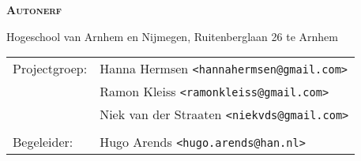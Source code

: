 \begin{titlepage}

\Huge \textsc{\bfseries Autonerf} \normalsize

\vfill

\begin{minipage}[b][1em][b]{\linewidth}
    Hogeschool van Arnhem en Nijmegen, Ruitenberglaan 26 te Arnhem
\end{minipage}

\begin{minipage}[b][2em][b]{\linewidth}
\end{minipage}

\begin{minipage}[b][4em][b]{\linewidth}
    \begin{tabular}{l l }
        Projectgroep: & Hanna Hermsen \texttt{<hannahermsen@gmail.com>}\\
        & Ramon Kleiss \texttt{<ramonkleiss@gmail.com>} \\
        & Niek van der Straaten \texttt{<niekvds@gmail.com>} \\
        \\
        Begeleider: & Hugo Arends \texttt{<hugo.arends@han.nl>} \\
    \end{tabular}
\end{minipage}

\end{titlepage}
